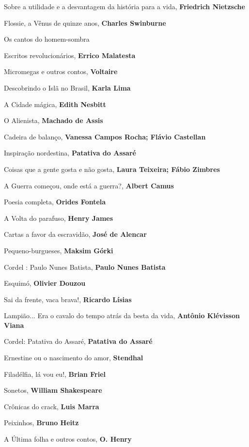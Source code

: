 \begin{multicols}{2}
\begin{enumerate}
{\item Sobre a utilidade e a desvantagem da história para a vida, \textbf{Friedrich Nietzsche}
\item Flossie, a Vênus de quinze anos, \textbf{Charles Swinburne}
\item Os cantos do homem-sombra
\item Escritos revolucionários, \textbf{Errico Malatesta}
\item Micromegas e outros contos, \textbf{Voltaire}
\item Descobrindo o Islã no Brasil, \textbf{Karla Lima}
\item A Cidade mágica, \textbf{Edith Nesbitt}
\item O Alienista, \textbf{Machado de Assis}
\item Cadeira de balanço, \textbf{Vanessa Campos Rocha; Flávio Castellan}
\item Inspiração nordestina, \textbf{Patativa do Assaré}
\item Coisas que a gente gosta e não gosta, \textbf{Laura Teixeira; Fábio Zimbres}
\item A Guerra começou, onde está a guerra?, \textbf{Albert Camus}
\item Poesia completa, \textbf{Orides Fontela}
\item A Volta do parafuso, \textbf{Henry James}
\item Cartas a favor da escravidão, \textbf{José de Alencar}
\item Pequeno-burgueses, \textbf{Maksim Górki}
\item Cordel : Paulo Nunes Batista, \textbf{Paulo Nunes Batista}
\item Esquimó, \textbf{Olivier Douzou}
\item Sai da frente, vaca brava!, \textbf{Ricardo Lísias}
\item Lampião... Era o cavalo do tempo atrás da besta da vida, \textbf{Antônio Klévisson Viana}
\item Cordel: Patativa do Assaré, \textbf{Patativa do Assaré}
\item Ernestine ou o nascimento do amor, \textbf{Stendhal}
\item Filadélfia, lá vou eu!, \textbf{Brian Friel}
\item Sonetos, \textbf{William Shakespeare}
\item Crônicas do crack, \textbf{Luis Marra}
\item Peixinhos, \textbf{Bruno Heitz}
\item A Última folha e outros contos, \textbf{O. Henry}
}
\end{enumerate}
\end{multicols}
